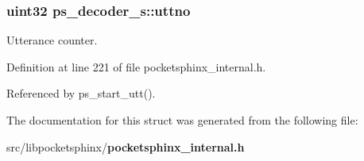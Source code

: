\subsubsection[{uttno}]{\setlength{\rightskip}{0pt plus 5cm}uint32 ps\+\_\+decoder\+\_\+s\+::uttno}\label{structps__decoder__s_a0f597370dd162c2799efe216c9b991fc}


Utterance counter. 



Definition at line 221 of file pocketsphinx\+\_\+internal.\+h.



Referenced by ps\+\_\+start\+\_\+utt().



The documentation for this struct was generated from the following file\+:\begin{DoxyCompactItemize}
\item 
src/libpocketsphinx/{\bf pocketsphinx\+\_\+internal.\+h}\end{DoxyCompactItemize}
